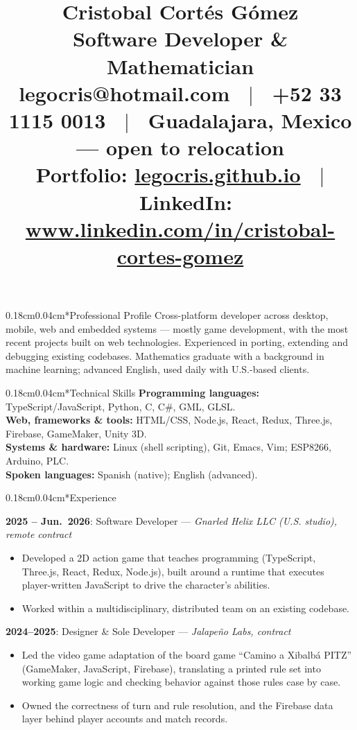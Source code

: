 \documentclass[10.5pt]{article}
\title{\vspace{-1.5cm} \Huge{Cristobal Cortés Gómez} \\ \large{Software Developer \& Mathematician} \\
\vspace{0.25cm}
\normalsize{
legocris@hotmail.com \ $|$ \ +52 33 1115 0013 \ $|$ \ Guadalajara, Mexico --- open to relocation \\
Portfolio: \url{legocris.github.io} \ $|$ \ LinkedIn: \url{www.linkedin.com/in/cristobal-cortes-gomez}
}
\vspace{-1cm}}
\author{}
\date{}
\makeatletter
\renewcommand{\section}{\@startsection{section}{1}{0pt}%
  {0.18cm}{0.04cm}{\normalfont\large\bfseries}}
\makeatother
\begin{document}
\pagestyle{empty}

\maketitle
\thispagestyle{empty}

\section*{Professional Profile}
Cross-platform developer across desktop, mobile, web and embedded systems --- mostly game development, with the most recent projects built on web technologies. Experienced in porting, extending and debugging existing codebases. Mathematics graduate with a background in machine learning; advanced English, used daily with U.S.-based clients.

\section*{Technical Skills}
\textbf{Programming languages:} TypeScript/JavaScript, Python, C, C\#, GML, GLSL. \\
\textbf{Web, frameworks \& tools:} HTML/CSS, Node.js, React, Redux, Three.js, Firebase, GameMaker, Unity 3D. \\
\textbf{Systems \& hardware:} Linux (shell scripting), Git, Emacs, Vim; ESP8266, Arduino, PLC. \\
\textbf{Spoken languages:} Spanish (native); English (advanced).

\section*{Experience}

\textbf{2025 -- Jun.\ 2026}: Software Developer --- \textit{Gnarled Helix LLC (U.S. studio), remote contract}
\begin{itemize}
    \item Developed a 2D action game that teaches programming (TypeScript, Three.js, React, Redux, Node.js), built around a runtime that executes player-written JavaScript to drive the character's abilities.
    \item Worked within a multidisciplinary, distributed team on an existing codebase.
\end{itemize}

\textbf{2024--2025}: Designer \& Sole Developer --- \textit{Jalapeño Labs, contract}
\begin{itemize}
    \item Led the video game adaptation of the board game ``Camino a Xibalbá PITZ'' (GameMaker, JavaScript, Firebase), translating a printed rule set into working game logic and checking behavior against those rules case by case.
    \item Owned the correctness of turn and rule resolution, and the Firebase data layer behind player accounts and match records.
\end{itemize}
\end{document}
